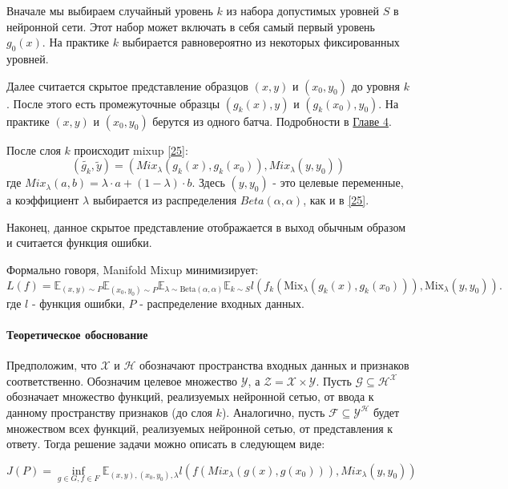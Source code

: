 Вначале мы выбираем случайный уровень $k$ из набора допустимых уровней $S$ в нейронной сети. Этот набор может включать в себя самый первый уровень $g_0(x)$. На практике $k$ выбирается равновероятно из некоторых фиксированных уровней.

Далее считается скрытое представление образцов $(x, y)$ и $(x_0, y_0)$ до уровня $k$. После этого есть промежуточные образцы $(g_k(x), y)$ и $(g_k(x_0), y_0)$. На практике $(x, y)$ и $(x_0, y_0)$ берутся из одного батча. Подробности в \hyperref[sec:Chapter3]{Главе 4}.

После слоя $k$ происходит mixup \hyperlink{cite.Hon17}{[25]}:
\begin{equation}
    (\tilde{g_k}, \tilde{y}) = (Mix_{\lambda}(g_k(x), g_k(x_0)), Mix_{\lambda}(y, y_0))
\end{equation}
где $Mix_{\lambda}(a, b) = \lambda \cdot a + (1 - \lambda) \cdot b$. Здесь $(y, y_0)$ - это целевые переменные, а коэффициент $\lambda$ выбирается из распределения $Beta(\alpha, \alpha)$, как и в \hyperlink{cite.Hon17}{[25]}.

Наконец, данное скрытое представление отображается в выход обычным образом и считается функция ошибки.

Формально говоря, Manifold Mixup минимизирует:
\begin{equation}
L(f) = \mathbb{E}_{(x,y) \sim P} \mathbb{E}_{(x_0, y_0) \sim P} \mathbb{E}_{\lambda \sim \text{Beta}(\alpha, \alpha)} \mathbb{E}_{k \sim S} l( f_k\left( \text{Mix}_{\lambda}(g_k(x), g_k(x_0)) \right), \text{Mix}_{\lambda}(y, y_0)).
\end{equation}
где $l$ - функция ошибки, $P$ - распределение входных данных.

\paragraph{Теоретическое обоснование}
Предположим, что $\mathcal{X}$ и $\mathcal{H}$ обозначают пространства входных данных и признаков соответственно. Обозначим целевое множество $\mathcal{Y}$, а $\mathcal{Z} = \mathcal{X} \times \mathcal{Y}$. Пусть $\mathcal{G} \subseteq \mathcal{H}^\mathcal{X}$ обозначает множество функций, реализуемых нейронной сетью, от ввода к данному пространству признаков (до слоя $k$). Аналогично, пусть $\mathcal{F} \subseteq \mathcal{Y}^\mathcal{H}$ будет множеством всех функций, реализуемых нейронной сетью, от представления к ответу. Тогда решение задачи можно описать в следующем виде:

\begin{equation}
J(P) = \inf_{g\in G, f\in F} \mathbb{E}_{(x,y),(x_0, y_0), \lambda} l( f(Mix_\lambda(g(x), g(x_0))), Mix_\lambda(y, y_0))
\end{equation}

